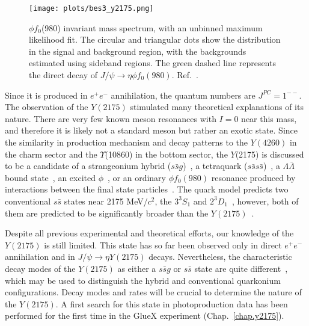     \begin{figure}[htbp]
        \centering
            \texttt{[image: plots/bes3\_y2175.png]}
            \caption{$\phi f_0$(980) invariant mass spectrum, with an unbinned maximum likelihood fit. The circular and triangular dots show the distribution in the signal and background region, with the backgrounds estimated using sideband regions. The green dashed line represents the direct decay of $J/\psi \rightarrow \eta \phi f_0(980)$. Ref.~\cite{Ablikim15}.}
            \label{fig.1.4.3}
    \end{figure}

\noindent Since it is produced in $e^+e^-$ annihilation, the quantum numbers are $J^{PC} = 1^{--}$. The observation of the $Y(2175)$ stimulated many theoretical explanations of its nature. There are very few known meson resonances with $I = 0$ near this mass, and therefore it is likely not a standard meson but rather an exotic state. Since the similarity in production mechanism and decay patterns to the $Y(4260)$ in the charm sector and the $\Upsilon$(10860) in the bottom sector, the $Y$(2175) is discussed to be a candidate of a strangeonium hybrid ($s\bar{s}g$)~\cite{Gui07}, a tetraquark ($s\bar{s}s\bar{s}$)~\cite{Chen08}, a $\Lambda \bar{\Lambda}$ bound state~\cite{Klempt07}, an excited $\phi$~\cite{Coito09}, or an ordinary $\phi f_0(980)$ resonance produced by interactions between the final state particles~\cite{Alvarez09}. The quark model predicts two conventional $s\bar{s}$ states near 2175 MeV/$c^2$, the ${3}^{3}\!S_{1}$ and ${2}^{3}\!D_{1}$~\cite{Godfrey85, Barnes97}, however, both of them are predicted to be significantly broader than the $Y(2175)$~\cite{Barnes03, Ding07}.
~\par Despite all previous experimental and theoretical efforts, our knowledge of the $Y(2175)$ is still limited. This state has so far been observed only in direct $e^{+}e^{-}$ annihilation and in $J/\psi \rightarrow \eta Y(2175)$ decays. Nevertheless, the characteristic decay modes of the $Y(2175)$ as either a $s\bar{s}g$ or $s\bar{s}$ state are quite different~\cite{Gui07, Isgur85}, which may be used to distinguish the hybrid and conventional quarkonium configurations. Decay modes and rates will be crucial to determine the nature of the $Y(2175)$. A first search for this state in photoproduction data has been performed for the first time in the GlueX experiment (Chap.~\ref{chap.y2175}).

